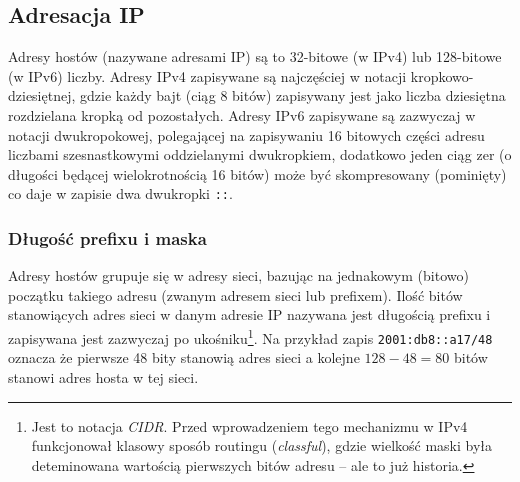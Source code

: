 % 
% 
% 
% 

\subsection{Adresacja IP}

Adresy hostów (nazywane adresami IP) są to 32-bitowe (w IPv4) lub 128-bitowe (w IPv6) liczby.
Adresy IPv4 zapisywane są najczęściej w notacji kropkowo-dziesiętnej, gdzie każdy bajt (ciąg 8 bitów) zapisywany jest jako liczba dziesiętna rozdzielana kropką od pozostałych. Adresy IPv6 zapisywane są zazwyczaj w notacji dwukropokowej, polegającej na zapisywaniu 16 bitowych części adresu liczbami szesnastkowymi oddzielanymi dwukropkiem, dodatkowo jeden ciąg zer (o długości będącej wielokrotnością 16 bitów) może być skompresowany (pominięty) co daje w zapisie dwa dwukropki \Verb$::$.

\subsubsection{Długość prefixu i maska}

Adresy hostów grupuje się w adresy sieci, bazując na jednakowym (bitowo) początku takiego adresu (zwanym adresem sieci lub prefixem). Ilość bitów stanowiących adres sieci w danym adresie IP nazywana jest długością prefixu i zapisywana jest zazwyczaj po ukośniku\footnote{
	Jest to notacja \textit{CIDR}. Przed wprowadzeniem tego mechanizmu w IPv4 funkcjonował klasowy sposób routingu (\textit{classful}), gdzie wielkość maski była deteminowana wartością pierwszych bitów adresu – ale to już historia.
}. Na przykład zapis \Verb$2001:db8::a17/48$ oznacza że pierwsze 48 bity stanowią adres sieci a kolejne $128-48 = 80$ bitów stanowi adres hosta w tej sieci.

